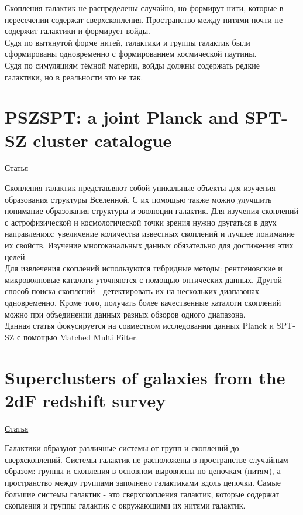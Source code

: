 \documentclass{article}
\begin{document}
Скопления галактик не распределены случайно, но формирут нити, которые в пересечении содержат 
сверхскопления. Пространство между нитями почти не содержит галактики и формирует войды.\\

Судя по вытянутой форме нитей, галактики и группы галактик были сформированы одновременно с 
формированием космической паутины.\\

Судя по симуляциям тёмной материи, войды должны содержать редкие галактики, но в реальности это не 
так.\\

\section{PSZSPT: a joint Planck and SPT-SZ cluster catalogue}
\hyperlink{https://arxiv.org/pdf/2009.08822.pdf}{Статья}

Скопления галактик представляют собой уникальные объекты для изучения образования структуры 
Вселенной. С их помощью также можно улучшить понимание образования структуры и эволюции галактик. 
Для изучения скоплений с астрофизической и космологической точки зрения нужно двугаться в двух 
направлениях: увеличение количества известных скоплений и лучшее понимание их свойств. Изучение 
многоканальных данных обязательно для достижения этих целей.\\

Для извлечения скоплений используются гибридные методы: рентгеновские и микроволновые каталоги 
уточняются с помощью оптических данных. Другой способ поиска скоплений - детектировать их на 
нескольких диапазонах одновременно. Кроме того, получать более качественные каталоги скоплений 
можно при объединении данных разных обзоров одного диапазона.\\

Данная статья фокусируется на совместном исследовании данных Planck и SPT-SZ с помощью Matched 
Multi Filter.\\

\section{Superclusters of galaxies from the 2dF redshift survey}
\hyperlink{https://www.aanda.org/articles/aa/pdf/2007/05/aa5296-06.pdf}{Статья}

Галактики образуют различные системы от групп и скоплений до сверхскоплений. Системы галактик 
не расположены в пространстве случайным образом: группы и скопления в основном выровнены по 
цепочкам (нитям), а пространство между группами заполнено галактиками вдоль цепочки. Самые большие
системы галактик - это сверхскопления галактик, которые содержат скопления и группы галактик с 
окружающими их нитями галактик.\\
\end{document}
